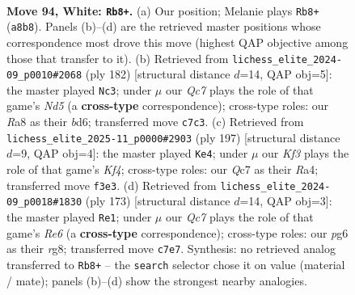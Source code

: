 \documentclass[11pt]{article}
\begin{document}
\clearpage

\begin{figure}[p]\centering
\begin{subfigure}{0.46\textwidth}\centering
\resizebox{\linewidth}{!}{%
\newchessgame
\chessboard[
  setfen={R7/2Q5/6p1/1k3p2/5P2/5K2/8/8 w - - 7 94},
  showmover=false,
  pgfstyle=straightmove, color=movearrow, markmove={a8-b8}
]}
\caption{}
\end{subfigure}\hfill
\begin{subfigure}{0.46\textwidth}\centering
\resizebox{\linewidth}{!}{%
\newchessgame
\chessboard[
  setfen={8/5k2/3b4/3N1p2/4p3/4P3/5K2/8 w - - 38 92},
  showmover=false,
  pgfstyle=straightmove, color=movearrow, markmove={d5-c3}
]}
\caption{}
\end{subfigure}
\\[4pt]
\begin{subfigure}{0.46\textwidth}\centering
\resizebox{\linewidth}{!}{%
\newchessgame
\chessboard[
  setfen={8/8/8/5k2/r5p1/2K3P1/7P/3R4 b - - 4 99},
  showmover=false,
  pgfstyle=straightmove, color=movearrow, markmove={f5-e4}
]}
\caption{}
\end{subfigure}\hfill
\begin{subfigure}{0.46\textwidth}\centering
\resizebox{\linewidth}{!}{%
\newchessgame
\chessboard[
  setfen={6R1/8/5k2/5p2/5P1K/4r3/8/8 b - - 6 87},
  showmover=false,
  pgfstyle=straightmove, color=movearrow, markmove={e3-e1}
]}
\caption{}
\end{subfigure}
\caption{\textbf{Move 94, White: \texttt{Rb8+}.} (a) Our position; Melanie plays \texttt{Rb8+} (\texttt{a8b8}). Panels (b)--(d) are the retrieved master positions whose correspondence most drove this move (highest QAP objective among those that transfer to it). (b) Retrieved from \texttt{lichess\_elite\_2024-09\_p0010\#2068} (ply 182) [structural distance $d$=14, QAP obj=5]: the master played \texttt{Nc3}; under $\mu$ our \emph{Qc7} plays the role of that game's \emph{Nd5} (a \textbf{cross-type} correspondence); cross-type roles: our \emph{R}a8 as their \emph{b}d6; transferred move \texttt{c7c3}. (c) Retrieved from \texttt{lichess\_elite\_2025-11\_p0000\#2903} (ply 197) [structural distance $d$=9, QAP obj=4]: the master played \texttt{Ke4}; under $\mu$ our \emph{Kf3} plays the role of that game's \emph{Kf4}; cross-type roles: our \emph{Q}c7 as their \emph{R}a4; transferred move \texttt{f3e3}. (d) Retrieved from \texttt{lichess\_elite\_2024-09\_p0018\#1830} (ply 173) [structural distance $d$=14, QAP obj=3]: the master played \texttt{Re1}; under $\mu$ our \emph{Qc7} plays the role of that game's \emph{Re6} (a \textbf{cross-type} correspondence); cross-type roles: our \emph{p}g6 as their \emph{r}g8; transferred move \texttt{c7e7}. Synthesis: no retrieved analog transferred to \texttt{Rb8+} -- the \texttt{search} selector chose it on value (material / mate); panels (b)--(d) show the strongest nearby analogies.}
\label{fig:thought-m186}
\end{figure}
\end{document}
